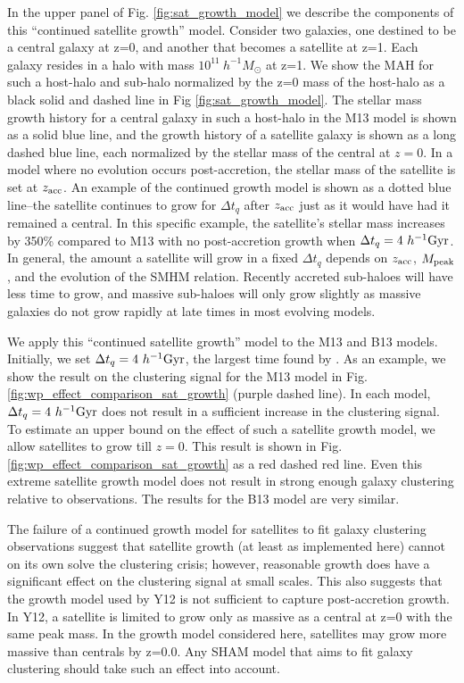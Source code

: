 \documentclass[a4paper,fleqn,usenatbib]{mnras}
\begin{document}
In the upper panel of Fig. \ref{fig:sat_growth_model} we describe the components of this ``continued satellite growth'' model.  Consider two galaxies, one destined to be a central galaxy at z=0, and another that becomes a satellite at z=1.  Each galaxy resides in a halo with mass $10^{11}~h^{-1}M_{\odot}$ at z=1.  We show the MAH for such a host-halo and sub-halo normalized by the z=0 mass of the host-halo as a black solid and dashed line in Fig \ref{fig:sat_growth_model}.  The stellar mass growth history for a central galaxy in such a host-halo in the M13 model is shown as a solid blue line, and the growth history of a satellite galaxy is shown as a long dashed blue line, each  normalized by the stellar mass of the central at $z=0$.  In a model where no evolution occurs post-accretion, the stellar mass of the satellite is set at $z_{\rm acc}$.  An example of the continued growth model is shown as a dotted blue line--the satellite continues to grow for $\Delta t_q$ after $z_{\rm acc}$ just as it would have had it remained a central.  In this specific example, the satellite's stellar mass increases by 350\% compared to M13 with no post-accretion growth when $\Delta t_q=4~h^{-1}{\rm Gyr}$.  In general, the amount a satellite will grow in a fixed $\Delta t_q$ depends on $z_{\rm acc}$, $M_{\rm peak}$, and the evolution of the SMHM relation.  Recently accreted sub-haloes will have less time to grow, and massive sub-haloes will only grow slightly as massive galaxies do not grow rapidly at late times in most evolving models.  

We apply this ``continued satellite growth'' model to the M13 and B13 models.  Initially, we set $\Delta t_{q}=4 ~h^{-1}{\rm Gyr}$, the largest time found by \citet{Wetzel:2013dw}.  As an example, we show the result on the clustering signal for the M13 model in Fig. \ref{fig:wp_effect_comparison_sat_growth} (purple dashed line).  In each model, $\Delta t_{q}=4 ~h^{-1}{\rm Gyr}$ does not result in a sufficient increase in the clustering signal.  To estimate an upper bound on the effect of such a satellite growth model, we allow satellites to grow till $z=0$.  This result is shown in Fig. \ref{fig:wp_effect_comparison_sat_growth} as a red dashed red line.  Even this extreme satellite growth model does not result in strong enough galaxy clustering relative to observations.  The results for the B13 model are very similar.  

The failure of a continued growth model for satellites to fit galaxy clustering observations suggest that satellite growth (at least as implemented here) cannot on its own solve the clustering crisis; however, reasonable growth does have a significant effect on the clustering signal at small scales.  This also suggests that the growth model used by Y12 is not sufficient to capture post-accretion growth.  In Y12, a satellite is limited to grow only as massive as a central at z=0 with the same peak mass.  In the growth model considered here, satellites may grow more massive than centrals by z=0.0.  Any SHAM model that aims to fit galaxy clustering should take such an effect into account.  
\end{document}
